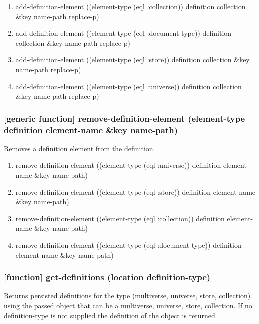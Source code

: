 \documentclass[11pt]{article}
\begin{document}
\begin{enumerate}
\item add-definition-element ((element-type (eql :collection)) definition collection \&key name-path replace-p)
\label{sec:org755324c}
\item add-definition-element ((element-type (eql :document-type)) definition collection \&key name-path replace-p)
\label{sec:orgafa1d28}
\item add-definition-element ((element-type (eql :store)) definition collection \&key name-path replace-p)
\label{sec:org5bd340d}
\item add-definition-element ((element-type (eql :universe)) definition collection \&key name-path replace-p)
\label{sec:org4612057}
\end{enumerate}

\subsubsection{[generic function] remove-definition-element (element-type definition element-name \&key name-path)}
\label{sec:org475b7a2}

Removes a definition element from the definition.

\begin{enumerate}
\item remove-definition-element ((element-type (eql :universe)) definition element-name \&key name-path)
\label{sec:org46a1541}
\item remove-definition-element ((element-type (eql :store)) definition element-name \&key name-path)
\label{sec:org84f847b}
\item remove-definition-element ((element-type (eql :collection)) definition element-name \&key name-path)
\label{sec:org52f1e0b}
\item remove-definition-element ((element-type (eql :document-type)) definition element-name \&key name-path)
\label{sec:orge4d6d32}
\end{enumerate}

\subsubsection{[function] get-definitions (location definition-type)}
\label{sec:org2db8141}

Returns persisted definitions for the type (multiverse, universe,
store, collection) using the passed object that can be a multiverse,
universe, store, collection.  If no definition-type is not supplied
the definition of the object is returned.
\end{document}

